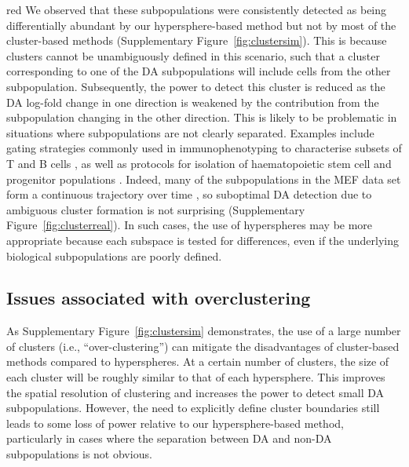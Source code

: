 \documentclass{article}
\begin{document}
\begin{color}{red}
We observed that these subpopulations were consistently detected as being differentially abundant by our hypersphere-based method but not by most of the cluster-based methods (Supplementary Figure~\ref{fig:clustersim}).
This is because clusters cannot be unambiguously defined in this scenario, such that a cluster corresponding to one of the DA subpopulations will include cells from the other subpopulation.
Subsequently, the power to detect this cluster is reduced as the DA log-fold change in one direction is weakened by the contribution from the subpopulation changing in the other direction.
This is likely to be problematic in situations where subpopulations are not clearly separated.
Examples include gating strategies commonly used in immunophenotyping to characterise subsets of T and B cells \cite{finak2016standardizing}, as well as protocols for isolation of haematopoietic stem cell and progenitor populations \cite{wilson2015combined}.
Indeed, many of the subpopulations in the MEF data set form a continuous trajectory over time \cite{zunder2015continuous}, so suboptimal DA detection due to ambiguous cluster formation is not surprising (Supplementary Figure~\ref{fig:clusterreal}).
In such cases, the use of hyperspheres may be more appropriate because each subspace is tested for differences, even if the underlying biological subpopulations are poorly defined.
\end{color}


\subsection{Issues associated with overclustering}
As Supplementary Figure~\ref{fig:clustersim} demonstrates, the use of a large number of clusters (i.e., ``over-clustering'') can mitigate the disadvantages of cluster-based methods compared to hyperspheres.
At a certain number of clusters, the size of each cluster will be roughly similar to that of each hypersphere.
This improves the spatial resolution of clustering and increases the power to detect small DA subpopulations.
However, the need to explicitly define cluster boundaries still leads to some loss of power relative to our hypersphere-based method, particularly in cases where the separation between DA and non-DA subpopulations is not obvious.
\end{document}
